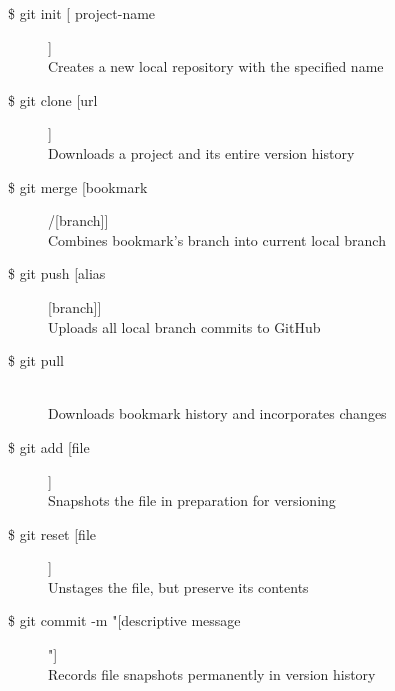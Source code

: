 \begin{description}

\item [\$ git init [ project-name]]\\
Creates a new local repository with the specified name
\item [\$ git clone [url]]\\
Downloads a project and its entire version history\\
\item [\$ git merge [bookmark]/[branch]]\\
Combines bookmark’s branch into current local branch

\item [\$ git push [alias][branch]]\\
Uploads all local branch commits to GitHub

\item [\$ git pull] \leavevmode \\
Downloads bookmark history and incorporates changes

\item [\$ git add [file]]\\
Snapshots the file in preparation for versioning

\item [\$ git reset [file]]\\
Unstages the file, but preserve its contents

\item [\$ git commit -m "[descriptive message]"]\\
Records file snapshots permanently in version history\\

\end{description}